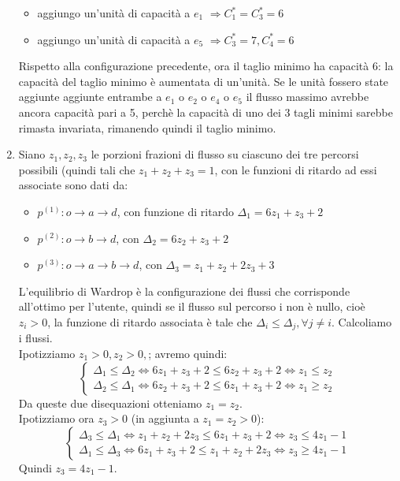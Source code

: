 \documentclass[11pt,largemargins]{homework}
\begin{document}
\begin{enumerate}[label=(\alph*)]
\begin{itemize}
\item aggiungo un'unità di capacità a $e_1$ $\Rightarrow C_1^*=C^*_3=6$
\item aggiungo un'unità di capacità a $e_5$ $\Rightarrow C_3^*=7, C^*_4=6$
\end{itemize} 

Rispetto alla configurazione precedente, ora il taglio minimo ha ca\-pa\-ci\-tà 6: la capacità del taglio minimo è aumentata di un'unità.
Se le unità fossero state aggiunte aggiunte entrambe a $e_1$ o $e_2$ o $e_4$ o $e_5$ il flusso massimo avrebbe ancora capacità pari a 5, perchè la capacità di uno dei 3 tagli minimi sarebbe rimasta invariata, rimanendo quindi il taglio minimo.
\item %
Siano $z_1, z_2, z_3$ le porzioni frazioni di flusso su ciascuno dei tre percorsi possibili (quindi tali che $z_1+z_2+z_3=1$, con le funzioni di ritardo ad essi associate sono dati da:
\begin{itemize}
\item $p^{(1)}: o\rightarrow a \rightarrow d$, con funzione di ritardo  
$\Delta_1=6z_1+z_3+2$
\item $p^{(2)}: o\rightarrow b \rightarrow d$, con $\Delta_2=6z_2+z_3+2$
\item $p^{(3)}: o\rightarrow a\rightarrow b \rightarrow d$, con $\Delta_3=z_1+z_2+2z_3+3$
\end{itemize}
L'equilibrio di Wardrop è la configurazione dei flussi che corrisponde all'ottimo per l'utente, quindi se il flusso sul percorso i non è nullo, cioè $z_i>0$, la funzione di ritardo associata è tale che $\Delta_i\leq\Delta_j, \forall j \neq i$. Calcoliamo i flussi.\\
Ipotizziamo $z_1>0, z_2>0,$; avremo quindi: 
\[\begin{cases} \Delta_1\leq \Delta_2 \Leftrightarrow 6z_1+z_3+2\leq 6z_2+z_3+2 \Leftrightarrow z_1\leq z_2\\ 
\Delta_2\leq \Delta_1 \Leftrightarrow 6z_2+z_3+2\leq 6z_1+z_3+2 \Leftrightarrow z_1\geq z_2\end{cases}\]
Da queste due disequazioni otteniamo $z_1=z_2$.\\
Ipotizziamo ora $z_3>0$ (in aggiunta a $z_1=z_2>0$):
\[\begin{cases} \Delta_3 \leq \Delta_1 \Leftrightarrow z_1+z_2+2z_3 \leq 6z_1+z_3+2 \Leftrightarrow z_3\leq 4z_1-1 \\ \Delta_1 \leq \Delta_3 \Leftrightarrow 6z_1+z_3+2 \leq z_1+z_2+2z_3\Leftrightarrow z_3\geq 4z_1-1\end{cases}\]
Quindi $z_3=4z_1-1$.
 

\end{enumerate}
\end{document}
